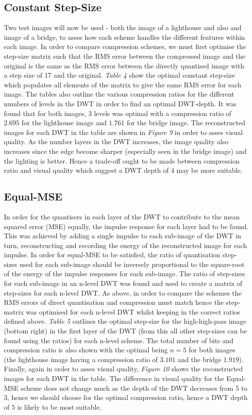 \documentclass{article}					%
\begin{document}
\subsection{Constant Step-Size}
Two test images will now be used - both the image of a lighthouse and also and image of a bridge, to asses how each scheme handles the different features within each image. In order to compare compression schemes, we must first optimise the step-size matrix such that the RMS error between the compressed image and the original is the same as the RMS error between the directly quantised image with a step size of 17 and the original. \textit{Table 4} show the optimal constant step-size which populates all elements of the matrix to give the same RMS error for each image. The tables also outline the various compression ratios for the different numbers of levels in the DWT in order to find an optimal DWT-depth. It was found that for both images, $3$ levels was optimal with a compression ratio of $2.695$ for the lighthouse image and $1.761$ for the bridge image. The reconstructed images for each DWT in the table are shown in \textit{Figure 9} in order to asses visual quality. As the number layers in the DWT increases, the image quality also increases since the edge become sharper (especially seen in the bridge image) and the lighting is better. Hence a trade-off ought to be made between compression ratio and visual quality which suggest a DWT depth of $4$ may be more suitable.
\subsection{Equal-MSE}
In order for the quantisers in each layer of the DWT to contribute to the mean squared error (MSE) equally, the impulse response for each layer had to be found. This was achieved by adding a single impulse to each sub-image of the DWT in turn, reconstructing and recording the energy of the reconstructed image for each impulse. In order for equal-MSE to be satisfied, the ratio of quantisation step-sizes used for each sub-image should be inversely proportional to the square-root of the energy of the impulse responses for each sub-image. The ratio of step-sizes for each sub-image in an n-level DWT was found and used to create a matrix of step-sizes for each n-level DWT. As above, in order to compare the schemes the RMS errors of direct quantisation and compression must match hence the step-matrix was optimised for each n-level DWT whilst keeping in the correct ratios defined above. \textit{Table 5} outlines the optimal step-size for the high-high-pass image (bottom right) in the first layer of the DWT (from this all other step-sizes can be found using the ratios) for each n-level scheme. The total number of bits and compression ratio is also shown with the optimal being $n=5$ for both images (the lighthouse image having a compression ratio of $3.101$ and the bridge $1.919$). Finally, again in order to asses visual quality, \textit{Figure 10} shows the reconstructed images for each DWT in the table. The difference in visual quality for the Equal-MSE scheme does not change much as the depth of the DWT decreases from 5 to 3, hence we should choose for the optimal compression ratio, hence a DWT depth of $5$ is likely to be most suitable.
\end{document}
